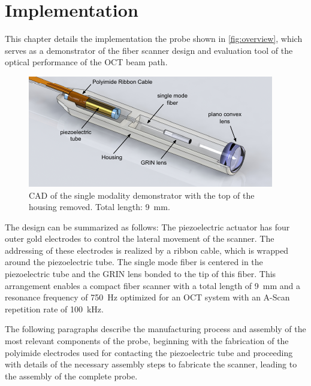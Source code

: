 %
\chapter{Implementation}
\label{Ch:Fab}	

This chapter details the implementation the probe shown in \autoref{fig:overview}, which serves as a demonstrator of the fiber scanner design and evaluation tool of the optical performance of the OCT beam path.

\begin{figure}[h!]\centering 
\includegraphics[width=\columnwidth]{figures/40_Fabrication/overview.pdf}
      \caption{CAD of the single modality demonstrator with the top of the housing removed. Total length: \SI{9}{\milli\meter}.}
      \label{fig:overview}
\end{figure}

The design can be summarized as follows: The piezoelectric actuator has four outer gold electrodes to control the lateral movement of the scanner. The addressing of these electrodes is realized by a ribbon cable, which is wrapped around the piezoelectric tube. The single mode fiber is centered in the piezoelectric tube and the GRIN lens bonded to the tip of this fiber. This arrangement enables a compact fiber scanner with a total length of \SI{9}{\milli\meter} and a resonance frequency of \SI{750}{\hertz} optimized for an OCT system with an A-Scan repetition rate of \SI{100}{\kilo\hertz}.

The following paragraphs describe the manufacturing process and assembly of the most relevant components of the probe, beginning with the fabrication of the polyimide electrodes used for contacting the piezoelectric tube and proceeding with details of the necessary assembly steps to fabricate the scanner, leading to the assembly of the complete probe.


